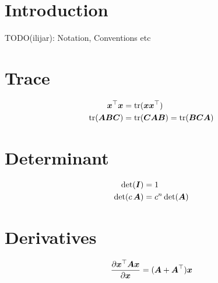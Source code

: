 \documentclass{article}
\title{\doctitle}
\author{\docauthor}
\begin{document}
\maketitle

\section{Introduction}
TODO(ilijar): Notation, Conventions etc

\section{Trace}

\begin{align}
  \vec x\T \vec x
    &= \tr{\vec x \vec x\T} \\
  \tr{\mat A \mat B \mat C}
    &= \tr{\mat C \mat A \mat B} = \tr{\mat B \mat C \mat A}
\end{align}

\section{Determinant}

\begin{align}
  \determ{\mat I}
    &= 1 \\
  \determ{c \, \mat A}
    &= c^{n} \, \determ{\mat A}
\end{align}

\section{Derivatives}

\begin{align}
  \frac{\partial \vec x\T \mat A \vec x}{\partial \vec x}
    = (\mat A + \mat A\T) \vec x
\end{align}
\end{document}
